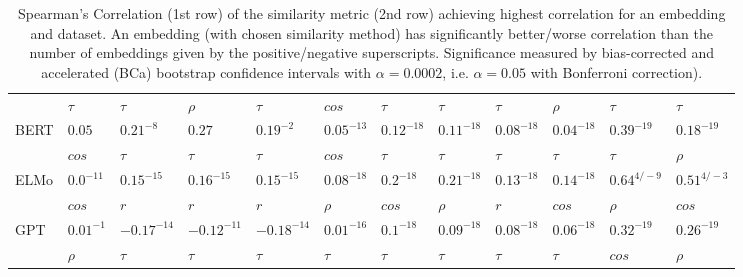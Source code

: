 \documentclass[letterpaper]{article} %
\begin{document}
\begin{table}
\begin{adjustbox}{angle=90}
\begin{tabular}{l l l l l l l l l l l l}
& $\tau$ & $\tau$ & $\rho$ & $\tau$ & $cos$ & $\tau$ & $\tau$ & $\tau$ & $\rho$ & $\tau$ & $\tau$ \\
BERT & $0.05$ & $0.21^{-8}$ & $0.27$ & $0.19^{-2}$ & $0.05^{-13}$ & $0.12^{-18}$ & $0.11^{-18}$ & $0.08^{-18}$ & $0.04^{-18}$ & $0.39^{-19}$ & $0.18^{-19}$ \\
 & $cos$ & $\tau$ & $\tau$ & $\tau$ & $cos$ & $\tau$ & $\tau$ & $\tau$ & $\tau$ & $\tau$ & $\rho$ \\
ELMo & $0.0^{-11}$ & $0.15^{-15}$ & $0.16^{-15}$ & $0.15^{-15}$ & $0.08^{-18}$ & $0.2^{-18}$ & $0.21^{-18}$ & $0.13^{-18}$ & $0.14^{-18}$ & $0.64^{4/-9}$ & $0.51^{4/-3}$ \\
& $cos$ & $r$ & $r$ & $r$ & $\rho$ & $cos$ & $\rho$ & $r$ & $cos$ & $\rho$ & $cos$ \\
GPT & $0.01^{-1}$ & $-0.17^{-14}$ & $-0.12^{-11}$ & $-0.18^{-14}$ & $0.01^{-16}$ & $0.1^{-18}$ & $0.09^{-18}$ & $0.08^{-18}$ & $0.06^{-18}$ & $0.32^{-19}$ & $0.26^{-19}$ \\
 & $\rho$ & $\tau$ & $\tau$ & $\tau$ & $\tau$ & $\tau$ & $\tau$ & $\tau$ & $\tau$ & $cos$ & $\rho$ \\
    \end{tabular}
    \end{adjustbox}
    \caption{Spearman's Correlation (1st row) of the similarity metric (2nd row) achieving highest correlation for an embedding and dataset. An embedding (with chosen similarity method) has significantly better/worse correlation than the number of embeddings given by the positive/negative superscripts. Significance measured by bias-corrected and accelerated (BCa)
bootstrap confidence intervals with $\alpha = 0.0002$, i.e. $\alpha = 0.05$ with Bonferroni correction).}
    \label{tab:significance_existingDatasets_full} 
\end{table}
\end{document}
